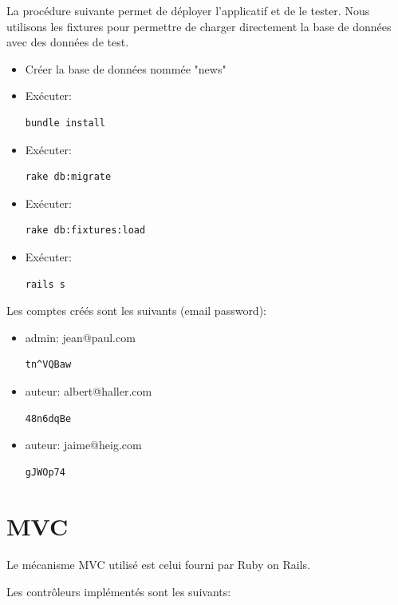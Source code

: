 \documentclass{article}
\begin{document}
La procédure suivante permet de déployer l'applicatif et de le tester. Nous utilisons les fixtures pour permettre de charger directement la base de données avec des données de test.

\begin{itemize}
\item Créer la base de données nommée "news"
\item Exécuter: \begin{verbatim}bundle install\end{verbatim}
\item Exécuter: \begin{verbatim}rake db:migrate\end{verbatim}
\item Exécuter: \begin{verbatim}rake db:fixtures:load\end{verbatim}
\item Exécuter: \begin{verbatim}rails s\end{verbatim}
\end{itemize}

Les comptes créés sont les suivants (email password):

\begin{itemize}
\item admin: jean@paul.com \begin{verbatim}tn^VQBaw\end{verbatim}
\item auteur: albert@haller.com \begin{verbatim}48n6dqBe\end{verbatim}
\item auteur: jaime@heig.com \begin{verbatim}gJWOp74\end{verbatim}
\end{itemize}

\newpage
\section{MVC}

Le mécanisme MVC utilisé est celui fourni par Ruby on Rails.

\par\null\par

Les contrôleurs implémentés sont les suivants:
\end{document}
